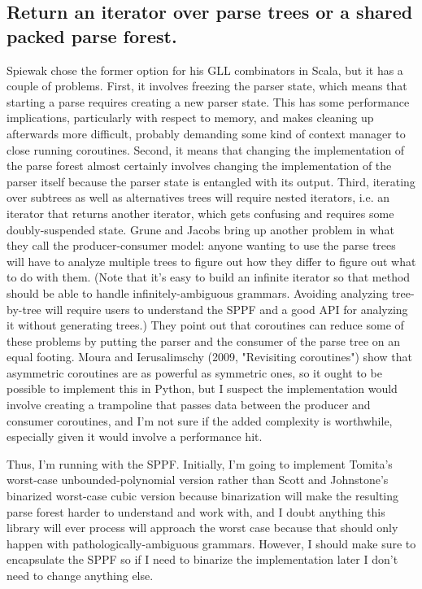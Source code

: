 \documentclass[12pt]{article}
\begin{document}
\subsection{Return an iterator over parse trees or a shared packed
  parse forest.}
\label{sec:iterator_sppf}

Spiewak chose the former option for his GLL combinators in Scala, but
it has a couple of problems.  First, it involves freezing the parser
state, which means that starting a parse requires creating a new
parser state.  This has some performance implications, particularly
with respect to memory, and makes cleaning up afterwards more
difficult, probably demanding some kind of context manager to close
running coroutines.  Second, it means that changing the implementation
of the parse forest almost certainly involves changing the
implementation of the parser itself because the parser state is
entangled with its output.  Third, iterating over subtrees as well as
alternatives trees will require nested iterators, i.e. an iterator
that returns another iterator, which gets confusing and requires some
doubly-suspended state.  Grune and Jacobs bring up another problem in
what they call the producer-consumer model: anyone wanting to use the
parse trees will have to analyze multiple trees to figure out how they
differ to figure out what to do with them.  (Note that it's easy to
build an infinite iterator so that method should be able to handle
infinitely-ambiguous grammars.  Avoiding analyzing tree-by-tree will
require users to understand the SPPF and a good API for analyzing it
without generating trees.)  They point out that coroutines can reduce
some of these problems by putting the parser and the consumer of the
parse tree on an equal footing.  Moura and Ierusalimschy (2009,
"Revisiting coroutines") show that asymmetric coroutines are as
powerful as symmetric ones, so it ought to be possible to implement
this in Python, but I suspect the implementation would involve
creating a trampoline that passes data between the producer and
consumer coroutines, and I'm not sure if the added complexity is
worthwhile, especially given it would involve a performance hit.

Thus, I'm running with the SPPF.  Initially, I'm going to implement
Tomita's worst-case unbounded-polynomial version rather than Scott and
Johnstone's binarized worst-case cubic version because binarization
will make the resulting parse forest harder to understand and work
with, and I doubt anything this library will ever process will
approach the worst case because that should only happen with
pathologically-ambiguous grammars.  However, I should make sure to
encapsulate the SPPF so if I need to binarize the implementation later
I don't need to change anything else.
\end{document}
